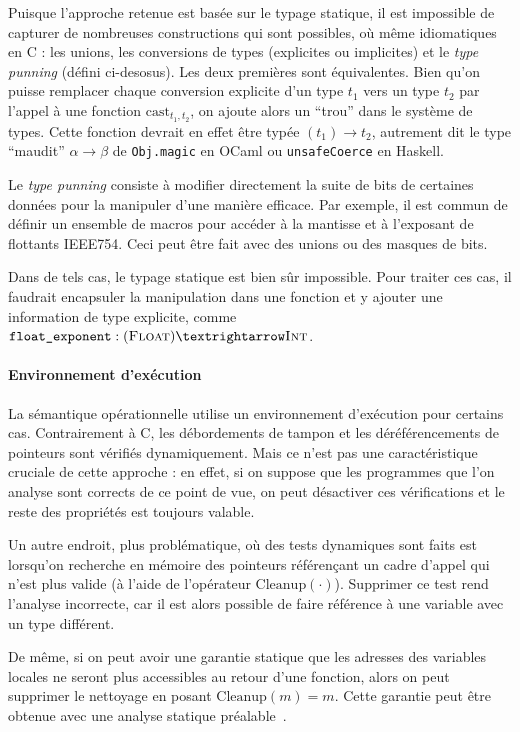 Puisque l'approche retenue est basée sur le typage statique, il est impossible
de capturer de nombreuses constructions qui sont possibles, où même idiomatiques
en C : les unions, les conversions de types (explicites ou implicites) et le
\emph{type punning} (défini ci-desosus). Les deux premières sont équivalentes.
Bien qu'on puisse remplacer chaque conversion explicite d'un type $t_1$ vers un
type $t_2$ par l'appel à une fonction $\mathrm{cast}_{t_1,t_2}$, on ajoute alors
un ``trou'' dans le système de types. Cette fonction devrait en effet être typée
$(t_1) → t_2$, autrement dit le type ``maudit'' $α → β$ de \texttt{Obj.magic} en
OCaml ou \texttt{unsafeCoerce} en Haskell.

Le \emph{type punning} consiste à modifier directement la suite de bits de
certaines données pour la manipuler d'une manière efficace. Par exemple, il est
commun de définir un ensemble de macros pour accéder à la mantisse et à
l'exposant de flottants IEEE754. Ceci peut être fait avec des unions ou des
masques de bits.

Dans de tels cas, le typage statique est bien sûr impossible. Pour traiter ces
cas, il faudrait encapsuler la manipulation dans une fonction et y ajouter une
information de type explicite, comme $\texttt{float\_exponent} : (\tFloat) →
\tInt$.

\paragraph{Environnement d'exécution}

La sémantique opérationnelle utilise un environnement d'exécution pour certains
cas. Contrairement à C, les débordements de tampon et les déréférencements de
pointeurs sont vérifiés dynamiquement. Mais ce n'est pas une caractéristique
cruciale de cette approche : en effet, si on suppose que les programmes que l'on
analyse sont corrects de ce point de vue, on peut désactiver ces vérifications
et le reste des propriétés est toujours valable.

Un autre endroit, plus problématique, où des tests dynamiques sont faits est
lorsqu'on recherche en mémoire des pointeurs référençant un cadre d'appel qui
n'est plus valide (à l'aide de l'opérateur $\mathrm{Cleanup}(\cdot)$). Supprimer
ce test rend l'analyse incorrecte, car il est alors possible de faire référence
à une variable avec un type différent.

De même, si on peut avoir une garantie statique que les adresses des variables
locales ne seront plus accessibles au retour d'une fonction, alors on peut
supprimer le nettoyage en posant $\mathrm{Cleanup}(m) = m$. Cette garantie peut
être obtenue avec une analyse statique préalable~\cite{ifm10}.

